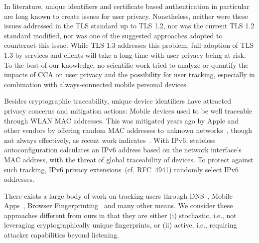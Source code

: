 In literature, unique identifiers and certificate based authentication in particular are long known to create issues for user privacy.
Nonetheless, neither were these issues addressed in the TLS standard up to TLS 1.2,  
nor was the current TLS 1.2 standard modified, nor was one of the suggested approaches adopted to counteract this issue.
%
While TLS 1.3 addresses this problem, full adoption of TLS 1.3 by services and clients will take a long time with user privacy being at risk. 
To the best of our knowledge, no scientific work tried to analyze or quantify the impacts of CCA on user privacy and the possibility for user tracking, especially in combination with always-connected mobile personal devices. 

Besides cryptographic traceability, unique device identifiers have attracted privacy concerns and mitigation actions: 
Mobile devices used to be well traceable through WLAN MAC addresses. 
This was mitigated years ago by Apple and other vendors by
offering random MAC addresses to unknown networks~\cite{vanhoef2016mac}, 
though not always effectively, as recent work indicates~\cite{martin2017study}.
With IPv6, stateless autoconfiguration calculates an IPv6 address based on the 
network interface's MAC address, with the threat of global traceability of devices.
To protect against such tracking, IPv6 privacy extensions~(cf. RFC~4941) randomly select IPv6 addresses.

There exists a large body of work on tracking users through DNS~\cite{krishnan2010dns}, Mobile Apps~\cite{recon16}, Browser Fingerprinting~\cite{acar2014web} and many other means.
We consider these approaches different from ours in that they are either (i) stochastic, i.e., not leveraging cryptographically unique fingerprints, or (ii) active, i.e., requiring attacker capabilities beyond listening.
